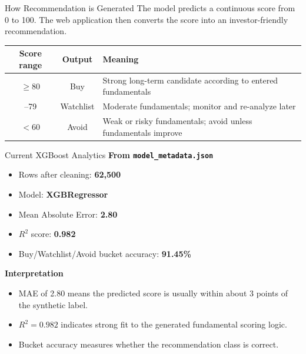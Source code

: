 \documentclass[aspectratio=169]{beamer}
\begin{document}
\begin{frame}{How Recommendation is Generated}
\small
\justifying
The model predicts a continuous score from 0 to 100. The web application then converts the score into an investor-friendly recommendation.

\vspace{0.3cm}
\begin{center}
\begin{tabular}{c c p{6.4cm}}
\toprule
\textbf{Score range} & \textbf{Output} & \textbf{Meaning} \\
\midrule
\(\geq 80\) & Buy & Strong long-term candidate according to entered fundamentals \\
\addlinespace
60--79 & Watchlist & Moderate fundamentals; monitor and re-analyze later \\
\addlinespace
\(<60\) & Avoid & Weak or risky fundamentals; avoid unless fundamentals improve \\
\bottomrule
\end{tabular}
\end{center}
\end{frame}

\begin{frame}{Current XGBoost Analytics}
\small
\textbf{From \texttt{model\_metadata.json}}
\begin{itemize}
  \item Rows after cleaning: \textbf{62,500}
  \item Model: \textbf{XGBRegressor}
  \item Mean Absolute Error: \textbf{2.80}
  \item \(R^2\) score: \textbf{0.982}
  \item Buy/Watchlist/Avoid bucket accuracy: \textbf{91.45\%}
\end{itemize}

\vspace{0.2cm}
\textbf{Interpretation}
\begin{itemize}
  \item MAE of 2.80 means the predicted score is usually within about 3 points of the synthetic label.
  \item \(R^2=0.982\) indicates strong fit to the generated fundamental scoring logic.
  \item Bucket accuracy measures whether the recommendation class is correct.
\end{itemize}
\end{frame}
\end{document}
